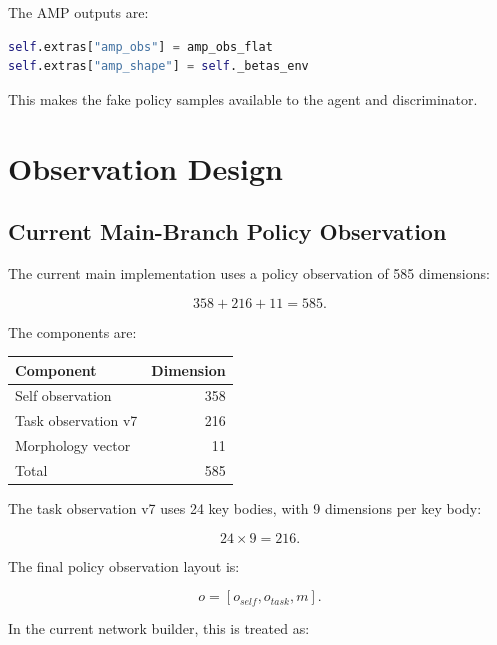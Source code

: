 \documentclass[11pt,a4paper]{article}
\begin{document}
The AMP outputs are:

\begin{lstlisting}[language=Python]
self.extras["amp_obs"] = amp_obs_flat
self.extras["amp_shape"] = self._betas_env
\end{lstlisting}

This makes the fake policy samples available to the agent and discriminator.

\section{Observation Design}

\subsection{Current Main-Branch Policy Observation}

The current main implementation uses a policy observation of 585 dimensions:

\begin{equation}
    358 + 216 + 11 = 585.
\end{equation}

The components are:

\begin{center}
    \begin{tabular}{lr}
        \toprule
        Component           & Dimension \\
        \midrule
        Self observation    & 358       \\
        Task observation v7 & 216       \\
        Morphology vector   & 11        \\
        \midrule
        Total               & 585       \\
        \bottomrule
    \end{tabular}
\end{center}

The task observation v7 uses 24 key bodies, with 9 dimensions per key body:

\begin{equation}
    24 \times 9 = 216.
\end{equation}

The final policy observation layout is:

\begin{equation}
    o = [o_{self}, o_{task}, m].
\end{equation}

In the current network builder, this is treated as:
\end{document}
